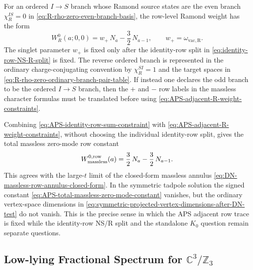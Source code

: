 \documentclass[11pt]{article}
\newcommand{\C}{\mathbb{C}}
\newcommand{\Z}{\mathbb{Z}}
\newcommand{\vac}{\mathrm{vac}}
\begin{document}
For an ordered \(I\to S\) branch whose Ramond source states are the even branch
\(\chi_R^{IS}=0\) in \eqref{eq:R-rho-zero-even-branch-basis}, the row-level Ramond weight has
the form
\begin{equation}
  W_R^0(a;0,0)
  =
  w_+\,N_a-\frac32\,N_{a-1},
  \qquad
  w_+=\omega_{\vac,\mathrm R}.
  \label{eq:APS-even-branch-R-weight-with-singlet-parameter}
\end{equation}
The singlet parameter \(w_+\) is fixed only after the identity-row split in
\eqref{eq:identity-row-NS-R-split} is fixed. The reverse ordered branch is represented
in the ordinary charge-conjugating convention by \(\chi_R^{SI}=1\) and the target spaces in
\eqref{eq:R-rho-zero-ordinary-branch-pair-table}. If instead one declares the odd branch to be
the ordered \(I\to S\) branch, then the \(+\) and \(-\) row labels in the massless character
formulas must be translated before using \eqref{eq:APS-adjacent-R-weight-constraints}.

Combining \eqref{eq:APS-identity-row-sum-constraint} with
\eqref{eq:APS-adjacent-R-weight-constraints}, without choosing the individual identity-row
split, gives the total massless zero-mode row constant
\begin{equation}
  W_{\rm massless}^{0,\mathrm{row}}(a)
  =
  \frac32\,N_a-\frac32\,N_{a-1}.
  \label{eq:APS-total-massless-zero-mode-constant}
\end{equation}
This agrees with the large-\(t\) limit of the closed-form massless annulus
\eqref{eq:DN-massless-row-annulus-closed-form}. In the symmetric tadpole solution the signed
constant \eqref{eq:APS-total-massless-zero-mode-constant} vanishes, but the ordinary
vertex-space dimensions in \eqref{eq:symmetric-projected-vertex-dimensions-after-DN-test} do
not vanish. This is the precise sense in which the APS adjacent row trace is fixed while the
identity-row NS/R split and the standalone \(K_0\) question remain separate questions.

\subsection{Low-lying Fractional Spectrum for \texorpdfstring{$\C^3/\Z_3$}{C3/Z3}}
\end{document}
